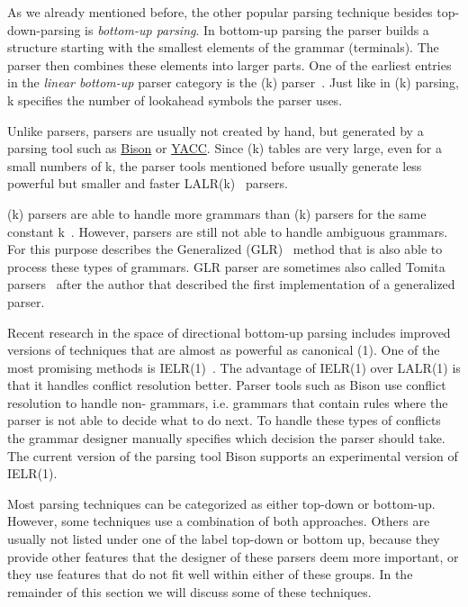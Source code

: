 As we already mentioned before, the other popular parsing technique besides top-down-parsing is \emph{bottom-up parsing}. In bottom-up parsing the parser builds a structure starting with the smallest elements of the grammar (terminals). The parser then combines these elements into larger parts. One of the earliest entries in the \emph{linear bottom-up} parser category is the (k) parser~\cite{knuth1965translation}. Just like in (k) parsing, k specifies the number of lookahead symbols the parser uses.

\begin{sloppypar}
Unlike  parsers,  parsers are usually not created by hand, but generated by a parsing tool such as \href{https://www.gnu.org/software/bison}{Bison} or \href{http://dinosaur.compilertools.net/yacc}{YACC}. Since (k) tables are very large, even for a small numbers of k, the parser tools mentioned before usually generate less powerful but smaller and faster LALR(k)~\cite{deremer1969practical} parsers.
\end{sloppypar}

(k) parsers are able to handle more grammars than (k) parsers for the same constant k~\cite[section “Lookahead”]{haberman2013ll}. However,  parsers are still not able to handle ambiguous grammars. For this purpose \citeauthor{lang1974deterministic} describes the Generalized  (GLR)~\cite{lang1974deterministic} method that is also able to process these types of grammars. GLR parser are sometimes also called Tomita parsers~\cite{tomita1985efficient} after the author that described the first implementation of a generalized  parser.

Recent research in the space of directional bottom-up parsing includes improved versions of techniques that are almost as powerful as canonical (1). One of the most promising methods is IELR(1)~\cite{denny2008ielr}. The advantage of IELR(1) over LALR(1) is that it handles conflict resolution better. Parser tools such as Bison use conflict resolution to handle non- grammars, i.e. grammars that contain rules where the parser is not able to decide what to do next. To handle these types of conflicts the grammar designer manually specifies which decision the parser should take. The current version of the parsing tool Bison supports an experimental version of IELR(1).

Most parsing techniques can be categorized as either top-down or bottom-up. However, some techniques use a combination of both approaches. Others are usually not listed under one of the label top-down or bottom up, because they provide other features that the designer of these parsers deem more important, or they use features that do not fit well within either of these groups. In the remainder of this section we will discuss some of these techniques.

